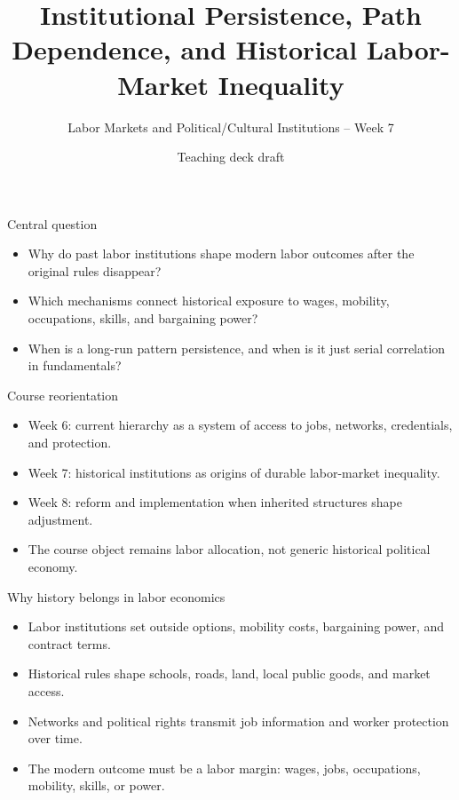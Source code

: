 \documentclass[aspectratio=169,11pt]{beamer}
\title{Institutional Persistence, Path Dependence, and Historical Labor-Market Inequality}
\subtitle{Labor Markets and Political/Cultural Institutions -- Week 7}
\author{Teaching deck draft}
\date{}
\begin{document}
\begin{frame}
  \titlepage
\end{frame}

\begin{frame}{Central question}
\begin{itemize}
    \item Why do past labor institutions shape modern labor outcomes after the original rules disappear?
    \item Which mechanisms connect historical exposure to wages, mobility, occupations, skills, and bargaining power?
    \item When is a long-run pattern persistence, and when is it just serial correlation in fundamentals?
\end{itemize}
\end{frame}

\begin{frame}{Course reorientation}
\begin{itemize}
    \item Week 6: current hierarchy as a system of access to jobs, networks, credentials, and protection.
    \item Week 7: historical institutions as origins of durable labor-market inequality.
    \item Week 8: reform and implementation when inherited structures shape adjustment.
    \item The course object remains labor allocation, not generic historical political economy.
\end{itemize}
\end{frame}

\begin{frame}{Why history belongs in labor economics}
\begin{itemize}
    \item Labor institutions set outside options, mobility costs, bargaining power, and contract terms.
    \item Historical rules shape schools, roads, land, local public goods, and market access.
    \item Networks and political rights transmit job information and worker protection over time.
    \item The modern outcome must be a labor margin: wages, jobs, occupations, mobility, skills, or power.
\end{itemize}
\end{frame}
\end{document}
